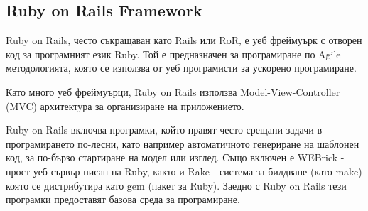 \documentclass[a4paper]{article}
\begin{document}
  \subsection{Ruby on Rails Framework}
  Ruby on Rails, често съкращаван като Rails или RoR, е уеб фреймуърк с отворен код за програмният език Ruby. Той е предназначен за програмиране по Agile методологията, която се използва от уеб програмисти за ускорено програмиране.

  Като много уеб фреймуърци, Ruby on Rails използва Model-View-Controller (MVC) архитектура за организиране на приложението.

  Ruby on Rails включва програмки, който правят често срещани задачи в програмирането по-лесни, като например автоматичното генериране на шаблонен код, за по-бързо стартиране на модел или изглед. Също включен е WEBrick - прост уеб сървър писан на Ruby, както и Rake - система за билдване (като make) която се дистрибутира като gem (пакет за Ruby). Заедно с Ruby on Rails тези програмки предоставят базова среда за програмиране.
\end{document}
